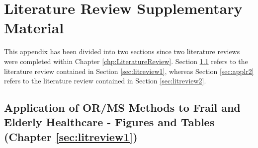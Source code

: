 \documentclass[thesis.tex]{subfiles}
\begin{document}
\chapter{Literature Review Supplementary Material}\label{App:LitReview}
This appendix has been divided into two sections since two literature reviews were completed within Chapter \ref{chp:LiteratureReview}. Section \ref{sec:applr1} refers to the literature review contained in Section \ref{sec:litreview1}, whereas Section \ref{sec:applr2} refers to the literature review contained in Section \ref{sec:litreview2}.


\section{Application of OR/MS Methods to Frail and Elderly Healthcare - Figures and Tables (Chapter \ref{sec:litreview1})}\label{sec:applr1}
\end{document}
